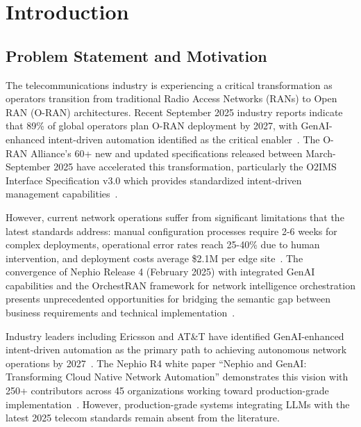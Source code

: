 \section{Introduction}

\subsection{Problem Statement and Motivation}

The telecommunications industry is experiencing a critical transformation as operators transition from traditional Radio Access Networks (RANs) to Open RAN (O-RAN) architectures. Recent September 2025 industry reports indicate that 89\% of global operators plan O-RAN deployment by 2027, with GenAI-enhanced intent-driven automation identified as the critical enabler~\cite{ericsson2025intent}. The O-RAN Alliance's 60+ new and updated specifications released between March-September 2025 have accelerated this transformation, particularly the O2IMS Interface Specification v3.0 which provides standardized intent-driven management capabilities~\cite{oran2025o2ims}.

However, current network operations suffer from significant limitations that the latest standards address: manual configuration processes require 2-6 weeks for complex deployments, operational error rates reach 25-40\% due to human intervention, and deployment costs average \$2.1M per edge site~\cite{mckinsey2025network}. The convergence of Nephio Release 4 (February 2025) with integrated GenAI capabilities and the OrchestRAN framework for network intelligence orchestration presents unprecedented opportunities for bridging the semantic gap between business requirements and technical implementation~\cite{nephio2025genai}.

Industry leaders including Ericsson and AT\&T have identified GenAI-enhanced intent-driven automation as the primary path to achieving autonomous network operations by 2027~\cite{att_ericsson2025genai}. The Nephio R4 white paper ``Nephio and GenAI: Transforming Cloud Native Network Automation'' demonstrates this vision with 250+ contributors across 45 organizations working toward production-grade implementation~\cite{nephio2025r4}. However, production-grade systems integrating LLMs with the latest 2025 telecom standards remain absent from the literature.

